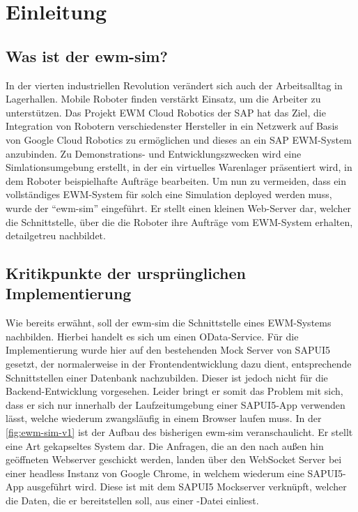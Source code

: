 \chapter{Einleitung}

\section{Was ist der \ac{ewm-sim}?}
In der vierten industriellen Revolution verändert sich auch der Arbeitsalltag in Lagerhallen.
Mobile Roboter finden verstärkt Einsatz, um die Arbeiter zu unterstützen.
Das Projekt \ac{EWM} Cloud Robotics der SAP hat das Ziel, die Integration von Robotern verschiedenster Hersteller in ein Netzwerk auf Basis von Google Cloud Robotics zu ermöglichen und dieses an ein SAP \ac{EWM}-System anzubinden.
Zu Demonstrations- und Entwicklungszwecken wird eine Simlationsumgebung erstellt, in der ein virtuelles Warenlager präsentiert wird, in dem Roboter beispielhafte Aufträge bearbeiten.
Um nun zu vermeiden, dass ein vollständiges \ac{EWM}-System für solch eine Simulation deployed werden muss, wurde der \enquote{\ac{ewm-sim}} eingeführt.
Er stellt einen kleinen Web-Server dar, welcher die Schnittstelle, über die die Roboter ihre Aufträge vom \ac{EWM}-System erhalten, detailgetreu nachbildet.

\section{Kritikpunkte der ursprünglichen Implementierung}
Wie bereits erwähnt, soll der \ac{ewm-sim} die Schnittstelle eines \ac{EWM}-Systems nachbilden. Hierbei handelt es sich um einen \ac{OData}-Service.
Für die Implementierung wurde hier auf den bestehenden Mock Server von SAPUI5 gesetzt, der normalerweise in der Frontendentwicklung dazu dient, entsprechende Schnittstellen einer Datenbank nachzubilden.
Dieser ist jedoch nicht für die Backend-Entwicklung vorgesehen.
Leider bringt er somit das Problem mit sich, dass er sich nur innerhalb der Laufzeitumgebung einer SAPUI5-App verwenden lässt, welche wiederum zwangsläufig in einem Browser laufen muss.
In der \autoref{fig:ewm-sim-v1} ist der Aufbau des bisherigen \ac{ewm-sim} veranschaulicht.
Er stellt eine Art gekapseltes System dar.
Die Anfragen, die an den nach außen hin geöffneten Webserver geschickt werden, landen über den WebSocket Server bei einer headless Instanz von Google Chrome, in welchem wiederum eine SAPUI5-App ausgeführt wird.
Diese ist mit dem SAPUI5 Mockserver verknüpft, welcher die Daten, die er bereitstellen soll, aus einer -Datei einliest.

